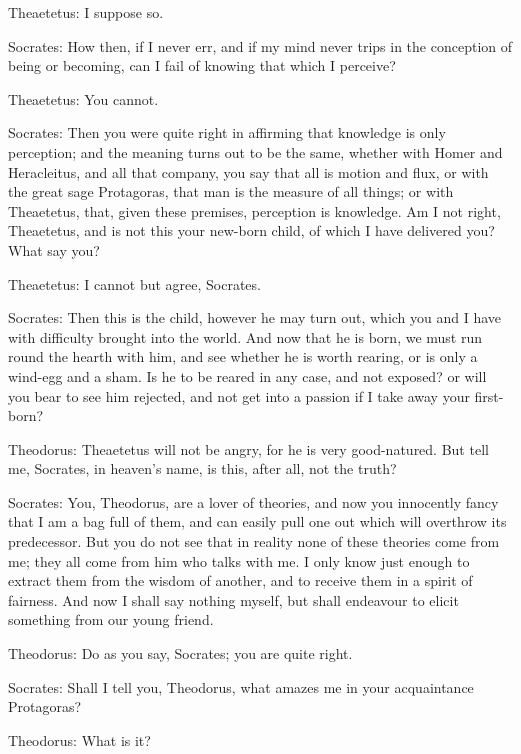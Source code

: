 Theaetetus: I suppose so.

Socrates: How then, if I never err, and if my mind never trips in the
conception of being or becoming, can I fail of knowing that which I
perceive?

Theaetetus: You cannot.

Socrates: Then you were quite right in affirming that knowledge is only
perception; and the meaning turns out to be the same, whether with Homer
and Heracleitus, and all that company, you say that all is motion and
flux, or with the great sage Protagoras, that man is the measure of all
things; or with Theaetetus, that, given these premises, perception is
knowledge. Am I not right, Theaetetus, and is not this your new-born
child, of which I have delivered you? What say you?

Theaetetus: I cannot but agree, Socrates.

Socrates: Then this is the child, however he may turn out, which you and
I have with difficulty brought into the world. And now that he is born,
we must run round the hearth with him, and see whether he is worth
rearing, or is only a wind-egg and a sham. Is he to be reared in any
case, and not exposed? or will you bear to see him rejected, and not get
into a passion if I take away your first-born?

Theodorus: Theaetetus will not be angry, for he is very good-natured.
But tell me, Socrates, in heaven's name, is this, after all, not the
truth?

Socrates: You, Theodorus, are a lover of theories, and now you
innocently fancy that I am a bag full of them, and can easily pull one
out which will overthrow its predecessor. But you do not see that in
reality none of these theories come from me; they all come from him who
talks with me. I only know just enough to extract them from the wisdom
of another, and to receive them in a spirit of fairness. And now I shall
say nothing myself, but shall endeavour to elicit something from our
young friend.

Theodorus: Do as you say, Socrates; you are quite right.

Socrates: Shall I tell you, Theodorus, what amazes me in your
acquaintance Protagoras?

Theodorus: What is it?

